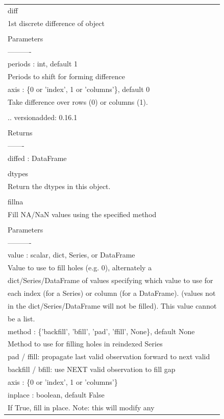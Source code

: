 \documentclass[11pt]{article}
\begin{document}
\begin{enumerate}
\begin{enumerate}
\begin{enumerate}
\begin{center}
\begin{tabular}{l}
diff\\
1st discrete difference of object\\
\\
Parameters\\
----------\\
periods : int, default 1\\
Periods to shift for forming difference\\
axis : \{0 or 'index', 1 or 'columns'\}, default 0\\
Take difference over rows (0) or columns (1).\\
\\
.. versionadded: 0.16.1\\
\\
Returns\\
-------\\
diffed : DataFrame\\
\\
dtypes\\
Return the dtypes in this object.\\
\\
fillna\\
Fill NA/NaN values using the specified method\\
\\
Parameters\\
----------\\
value : scalar, dict, Series, or DataFrame\\
Value to use to fill holes (e.g. 0), alternately a\\
dict/Series/DataFrame of values specifying which value to use for\\
each index (for a Series) or column (for a DataFrame). (values not\\
in the dict/Series/DataFrame will not be filled). This value cannot\\
be a list.\\
method : \{'backfill', 'bfill', 'pad', 'ffill', None\}, default None\\
Method to use for filling holes in reindexed Series\\
pad / ffill: propagate last valid observation forward to next valid\\
backfill / bfill: use NEXT valid observation to fill gap\\
axis : \{0 or 'index', 1 or 'columns'\}\\
inplace : boolean, default False\\
If True, fill in place. Note: this will modify any\\

\end{tabular}
\end{center}
\end{enumerate}
\end{enumerate}
\end{enumerate}
\end{document}
